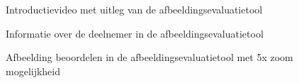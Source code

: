 \begin{figure}[h!]
	\caption{Introductievideo met uitleg van de \gls{afbeeldingsevaluatietool}}
	\label{fig:bijlages-screenshot-afbeeldingsevaluatietool-video}
\end{figure}

\begin{figure}[h!]
	\caption{Informatie over de deelnemer in de \gls{afbeeldingsevaluatietool}}
	\label{fig:bijlages-screenshot-afbeeldingsevaluatietool-over-u}
\end{figure}

\begin{figure}[h!]
	\caption{Afbeelding beoordelen in de \gls{afbeeldingsevaluatietool} met 5x zoom mogelijkheid}
	\label{fig:bijlages-screenshot-afbeeldingsevaluatietool-evalutie}
\end{figure}
